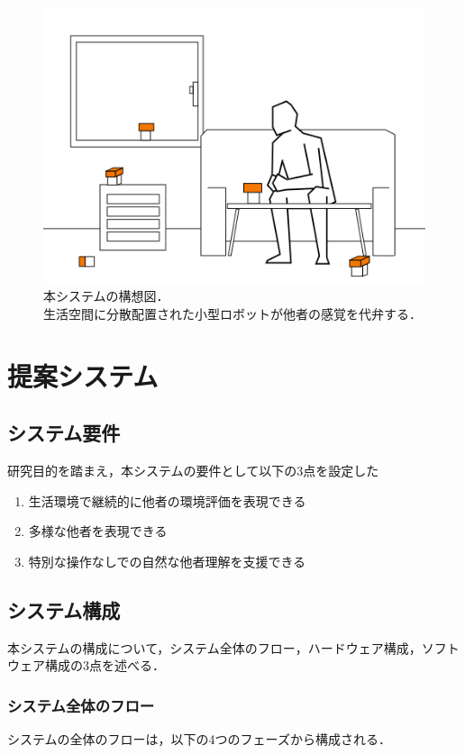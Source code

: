 \documentclass{cuxarticle}
\begin{document}
\begin{figure}[h]
  \centering
  \includegraphics[keepaspectratio,height=0.2\textheight]{resources/robot-in-house.png}
  \caption[short]{本システムの構想図．\\生活空間に分散配置された小型ロボットが他者の感覚を代弁する．}
  \label{fig:system-concept}
\end{figure}

\clearpage
\chapter{提案システム}

\section{システム要件}
研究目的を踏まえ，本システムの要件として以下の3点を設定した

\begin{enumerate}
  \item 生活環境で継続的に他者の環境評価を表現できる
  \item 多様な他者を表現できる
  \item 特別な操作なしでの自然な他者理解を支援できる
\end{enumerate}

\section{システム構成}
本システムの構成について，システム全体のフロー，ハードウェア構成，ソフトウェア構成の3点を述べる．

\subsection{システム全体のフロー}
システムの全体のフローは，以下の4つのフェーズから構成される．
\end{document}
